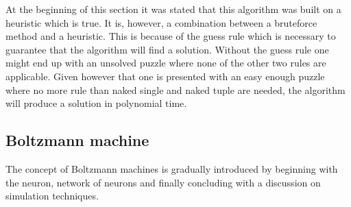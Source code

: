 \documentclass[a4paper,11pt]{kth-mag}
\begin{document}
At the beginning of this section it was stated that this algorithm was built on a heuristic which is true.
It is, however, a combination between a bruteforce method and a heuristic.
This is because of the guess rule which is necessary to guarantee that the algorithm will find a solution.
Without the guess rule one might end up with an unsolved puzzle where none of the other two rules are applicable.
Given however that one is presented with an easy enough puzzle where no more rule than naked single and naked tuple are needed, the algorithm will produce a solution in polynomial time.

\FloatBarrier
\subsection{Boltzmann machine}
\label{sec:boltzmannBackground}


The concept of Boltzmann machines is gradually introduced by beginning with the neuron, 
network of neurons and finally concluding with a discussion on simulation techniques.\\
\end{document}
